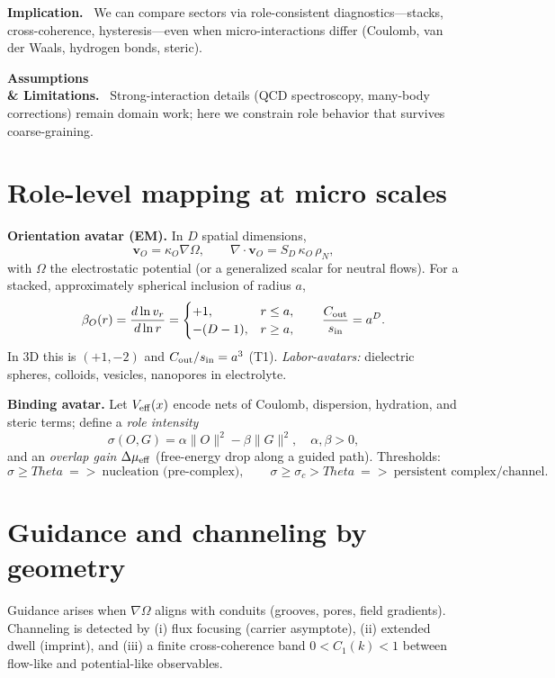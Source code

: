 \documentclass[12pt,a4paper,oneside]{scrreprt}
\def\Theta{Theta}%
\def\Rightarrow{=>}%
\newenvironment{implication}{\par\vspace{0.5em}\noindent\textbf{Implication.}\ }{\par\vspace{0.5em}}
\newenvironment{limitation}{\par\vspace{0.5em}\noindent\textbf{Assumptions \\ \& Limitations.}\ }{\par\vspace{0.5em}}
\begin{document}
\begin{implication}
We can compare sectors via role-consistent diagnostics—stacks, cross-coherence, hysteresis—even when micro-interactions differ (Coulomb, van der Waals, hydrogen bonds, steric).
\end{implication}

\begin{limitation}
Strong-interaction details (QCD spectroscopy, many-body corrections) remain domain work; here we constrain role behavior that survives coarse-graining.
\end{limitation}

\section{Role-level mapping at micro scales}\label{sec:micro-mapping}
\textbf{Orientation avatar (EM).} In $D$ spatial dimensions,
\[
\mathbf v_O=\kappa_O\nabla\Omega,\qquad \nabla\!\cdot\mathbf v_O=S_D\,\kappa_O\,\rho_N,
\]
with $\Omega$ the electrostatic potential (or a generalized scalar for neutral flows). For a stacked, approximately spherical inclusion of radius $a$,
\begin{equation}
\beta_O(r)=\frac{d\ln v_r}{d\ln r}=\begin{cases}+1,& r\le a,\\ -(D-1),& r\ge a,\end{cases}\qquad
\frac{C_{\rm out}}{s_{\rm in}}=a^{D}.
\end{equation}
In 3D this is $(+1,-2)$ and $C_{\rm out}/s_{\rm in}=a^3$ (T1). \emph{Labor-avatars:} dielectric spheres, colloids, vesicles, nanopores in electrolyte.

\textbf{Binding avatar.} Let $V_{\rm eff}(x)$ encode nets of Coulomb, dispersion, hydration, and steric terms; define a \emph{role intensity}
\[
\sigma(O,G)=\alpha\|O\|^2-\beta\|G\|^2,\quad \alpha,\beta>0,
\]
and an \emph{overlap gain} $\Delta\mu_{\rm eff}$ (free-energy drop along a guided path). Thresholds:
\[
\sigma\ge\Theta\ \Rightarrow\ \text{nucleation (pre-complex)},\qquad
\sigma\ge\sigma_c>\Theta\ \Rightarrow\ \text{persistent complex/channel}.
\]

\section{Guidance and channeling by geometry}\label{sec:micro-channeling}
Guidance arises when $\nabla\Omega$ aligns with conduits (grooves, pores, field gradients). Channeling is detected by (i) flux focusing (carrier asymptote), (ii) extended dwell (imprint), and (iii) a finite cross-coherence band $0<C_1(k)<1$ between flow-like and potential-like observables.
\end{document}
